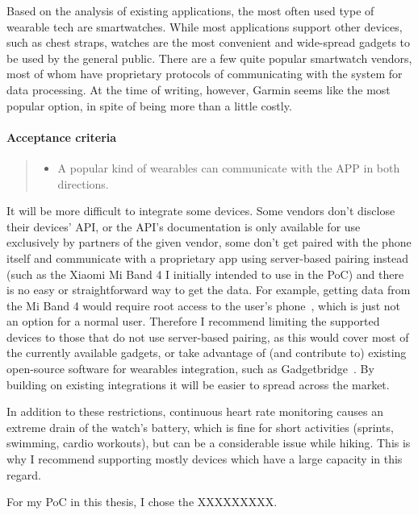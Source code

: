 Based on the analysis of existing applications, the most often used type of wearable tech are smartwatches.
While most applications support other devices, such as chest straps, watches are the most convenient and wide-spread gadgets to be used by the general public.
There are a few quite popular smartwatch vendors, most of whom have proprietary protocols of communicating with the system for data processing.
At the time of writing, however, Garmin seems like the most popular option, in spite of being more than a little costly.


\paragraph*{Acceptance criteria}
\begin{quote}
\begin{itemize}
    \item A popular kind of wearables can communicate with the APP in both directions.
\end{itemize}
\end{quote}

It will be more difficult to integrate some devices.
Some vendors don't disclose their devices' API, or the API's documentation is only available for use exclusively by partners of the given vendor,
some don't get paired with the phone itself and communicate with a proprietary app using server-based pairing instead (such as the Xiaomi Mi Band 4 I initially intended to use in the PoC) and there is no easy or straightforward way to get the data.
For example, getting data from the Mi Band 4 would require root access to the user's phone~\cite{miband4-server-based}, which is just not an option for a normal user.
Therefore I recommend limiting the supported devices to those that do not use server-based pairing, as this would cover most of the currently available gadgets,
or take advantage of (and contribute to) existing open-source software for wearables integration, such as Gadgetbridge~\cite{Gadgetbridge}.
By building on existing integrations it will be easier to spread across the market.

In addition to these restrictions, continuous heart rate monitoring causes an extreme drain of the watch's battery, which is fine for short activities (sprints, swimming, cardio workouts), but can be a considerable issue while hiking.
This is why I recommend supporting mostly devices which have a large capacity in this regard.

For my PoC in this thesis, I chose the XXXXXXXXX.


